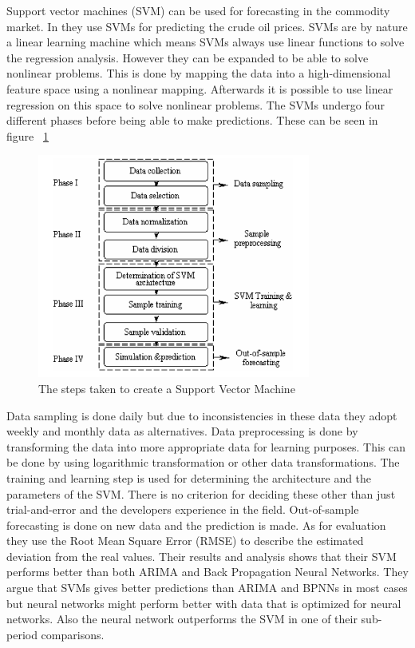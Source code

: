 Support vector machines (SVM) can be used for forecasting in the commodity market. In \cite{xie2006new} they use SVMs for predicting the crude oil prices. SVMs are by nature a linear learning machine which means SVMs always use linear functions to solve the regression analysis. However they can be expanded to be able to solve nonlinear problems. This is done by mapping the data into a high-dimensional feature space using a nonlinear mapping. Afterwards it is possible to use linear regression on this space to solve nonlinear problems. The SVMs undergo four different phases before being able to make predictions. These can be seen in figure ~\ref{fig:phasesOfSVM}
\begin{figure}[weight!]
\centering
\includegraphics[width=0.8\textwidth ,natwidth=410,natheight=237]{billeder/phases_of_SVM.png}
\caption{The steps taken to create a Support Vector Machine}
\label{fig:phasesOfSVM}
\end{figure}
Data sampling is done daily but due to inconsistencies in these data they adopt weekly and monthly data as alternatives. Data preprocessing is done by transforming the data into more appropriate data for learning purposes. This can be done by using logarithmic transformation or other data transformations. The training and learning step is used for determining the architecture and the parameters of the SVM. There is no criterion for deciding these other than just trial-and-error and the developers experience in the field. Out-of-sample forecasting is done on new data and the prediction is made. As for evaluation they use the Root Mean Square Error (RMSE) to describe the estimated deviation from the real values. Their results and analysis shows that their SVM performs better than both ARIMA and Back Propagation Neural Networks. They argue that SVMs gives better predictions than ARIMA and BPNNs in most cases but neural networks might perform better with data that is optimized for neural networks. Also the neural network outperforms the SVM in one of their sub-period comparisons.

